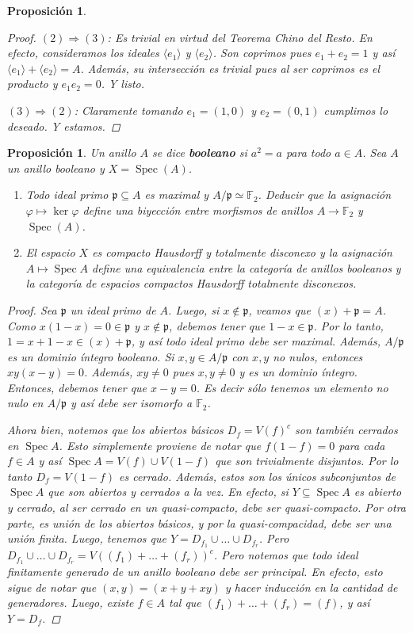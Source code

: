 \documentclass[11pt,a4paper, spanish,oneside,fleqn]{article}
\newtheorem{prop}[teo]{Proposición}
\theoremstyle{definition}
\newcommand{\FF}{\mathbb{F}}
\DeclareMathOperator{\spec}{Spec}
\begin{document}
\begin{prop}
\begin{proof}
$(2)\Longrightarrow (3)$: Es trivial en virtud del Teorema Chino del Resto. En efecto, consideramos los ideales $\langle e_1\rangle$ y $\langle e_2\rangle$. Son coprimos pues $e_1 + e_2=1$ y así $\langle e_1\rangle + \langle e_2\rangle = A$. Además, su intersección es trivial pues al ser coprimos es el producto y $e_1e_2=0$. Y listo.

$(3)\Longrightarrow (2)$: Claramente tomando $e_1= (1,0)$ y $e_2=(0,1)$ cumplimos lo deseado. Y estamos.
\end{proof}
\end{prop}

\begin{prop}
Un anillo $A$ se dice \textbf{booleano} si $a^2 = a$ para todo $a\in A$. Sea $A$ un anillo booleano y $X=\spec(A)$.
\begin{enumerate}
\item Todo ideal primo $\mathfrak{p}\subseteq A$ es maximal y $A/\mathfrak{p}\simeq \FF_2$. Deducir que la asignación $\varphi\mapsto \ker\varphi$ define una biyección entre morfismos de anillos $A\to \FF_2$ y $\spec(A)$.
\item El espacio $X$ es compacto Hausdorff y totalmente disconexo y la asignación $A\mapsto \spec A$ define una equivalencia entre la categoría de anillos booleanos y la categoría de espacios compactos Hausdorff totalmente disconexos. 
\end{enumerate}
\begin{proof}
Sea $\mathfrak{p}$ un ideal primo de $A$. Luego, si $x\notin \mathfrak{p}$, veamos que $(x)+\mathfrak{p} = A$. Como $x(1-x) = 0\in\mathfrak{p}$ y $x\notin \mathfrak{p}$, debemos tener que $1-x\in\mathfrak{p}$. Por lo tanto, $1 = x + 1-x \in (x) + \mathfrak{p}$, y así todo ideal primo debe ser maximal. Además, $A/\mathfrak{p}$ es un dominio íntegro booleano. Si $x,y\in A/\mathfrak{p}$ con $x,y$ no nulos, entonces $xy(x-y)=0$. Además, $xy \neq 0$ pues $x,y\neq 0$ y es un dominio íntegro. Entonces, debemos tener que $x-y=0$. Es decir sólo tenemos un elemento no nulo en $A/\mathfrak{p}$ y así debe ser isomorfo a $\FF_2$.

Ahora bien, notemos que los abiertos básicos $D_f = V(f)^c$ son también cerrados en $\spec A$. Esto simplemente proviene de notar que $f(1-f)=0$ para cada $f\in A$ y así $\spec A = V(f) \cup V(1-f)$ que son trivialmente disjuntos. Por lo tanto $D_f = V(1-f)$ es cerrado. Además, estos son los únicos subconjuntos de $\spec A$ que son abiertos y cerrados a la vez. En efecto, si $Y\subseteq \spec A$ es abierto y cerrado, al ser cerrado en un quasi-compacto, debe ser quasi-compacto. Por otra parte, es unión de los abiertos básicos, y por la quasi-compacidad, debe ser una unión finita. Luego, tenemos que $Y=D_{f_1}\cup\ldots\cup D_{f_r}$. Pero $D_{f_1}\cup\ldots \cup D_{f_r} = V((f_1)+\ldots + (f_r))^c$. Pero notemos que todo ideal finitamente generado de un anillo booleano debe ser principal. En efecto, esto sigue de notar que $(x,y) = (x+y+xy)$ y hacer inducción en la cantidad de generadores. Luego, existe $f\in A$ tal que $(f_1)+\ldots + (f_r) = (f)$, y así $Y = D_f$.


\end{proof}
\end{prop}
\end{document}
